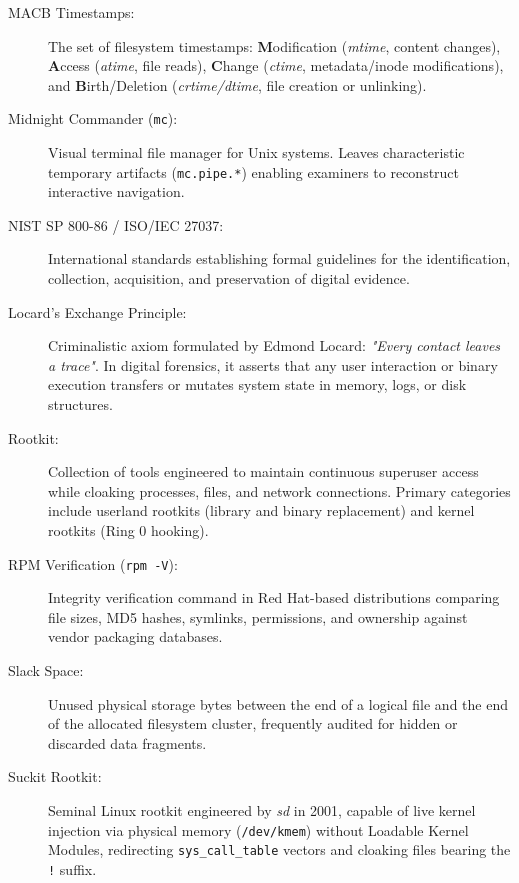 \begin{description}
    \item[MACB Timestamps:] The set of filesystem timestamps: \textbf{M}odification (\textit{mtime}, content changes), \textbf{A}ccess (\textit{atime}, file reads), \textbf{C}hange (\textit{ctime}, metadata/inode modifications), and \textbf{B}irth/Deletion (\textit{crtime/dtime}, file creation or unlinking).

    \item[Midnight Commander (\texttt{mc}):] Visual terminal file manager for Unix systems. Leaves characteristic temporary artifacts (\texttt{mc.pipe.*}) enabling examiners to reconstruct interactive navigation.

    \item[NIST SP 800-86 / ISO/IEC 27037:] International standards establishing formal guidelines for the identification, collection, acquisition, and preservation of digital evidence.

    \item[Locard's Exchange Principle:] Criminalistic axiom formulated by Edmond Locard: \textit{"Every contact leaves a trace"}. In digital forensics, it asserts that any user interaction or binary execution transfers or mutates system state in memory, logs, or disk structures.

    \item[Rootkit:] Collection of tools engineered to maintain continuous superuser access while cloaking processes, files, and network connections. Primary categories include userland rootkits (library and binary replacement) and kernel rootkits (Ring 0 hooking).

    \item[RPM Verification (\texttt{rpm -V}):] Integrity verification command in Red Hat-based distributions comparing file sizes, MD5 hashes, symlinks, permissions, and ownership against vendor packaging databases.

    \item[Slack Space:] Unused physical storage bytes between the end of a logical file and the end of the allocated filesystem cluster, frequently audited for hidden or discarded data fragments.

    \item[Suckit Rootkit:] Seminal Linux rootkit engineered by \textit{sd} in 2001, capable of live kernel injection via physical memory (\texttt{/dev/kmem}) without Loadable Kernel Modules, redirecting \texttt{sys\_call\_table} vectors and cloaking files bearing the \texttt{!} suffix.


\end{description}
